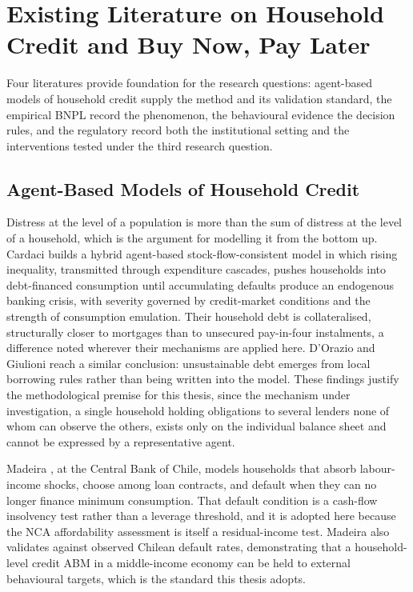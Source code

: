 \section{Existing Literature on Household Credit and Buy Now, Pay Later}
\label{ch:literature}

Four literatures provide foundation for the research questions: agent-based models of household credit supply
the method and its validation standard, the empirical \ac{BNPL} record the phenomenon, the
behavioural evidence the decision rules, and the regulatory record both the institutional setting
and the interventions tested under the third research question.

\subsection{Agent-Based Models of Household Credit}
\label{sec:lit-abm}

Distress at the level of a population is more than the sum of distress at the level of a
household, which is the argument for modelling it from the bottom up. Cardaci
\cite{cardaci2018inequality} builds a hybrid agent-based stock-flow-consistent model in which
rising inequality, transmitted through expenditure cascades, pushes households into debt-financed
consumption until accumulating defaults produce an endogenous banking crisis, with severity
governed by credit-market conditions and the strength of consumption emulation. Their household debt
is collateralised, structurally closer to mortgages than to unsecured pay-in-four instalments,
a difference noted wherever their mechanisms are applied here. D'Orazio and Giulioni
\cite{dorazio2017micro} reach a similar conclusion: unsustainable debt
emerges from local borrowing rules rather than being written into the model. These findings justify the
methodological premise for this thesis, since the mechanism under investigation, a single household
holding obligations to several lenders none of whom can observe the others, exists only on the
individual balance sheet and cannot be expressed by a representative agent.

Madeira \cite{madeira2018chile}, at the Central Bank of Chile, models households that absorb
labour-income shocks, choose among loan contracts, and default when they can no longer finance
minimum consumption. That default condition is a cash-flow insolvency test rather than a leverage
threshold, and it is adopted here because the \ac{NCA} affordability assessment is itself a
residual-income test. Madeira also validates against observed Chilean default rates, demonstrating
that a household-level credit \ac{ABM} in a middle-income economy can be held to external
behavioural targets, which is the standard this thesis adopts.

